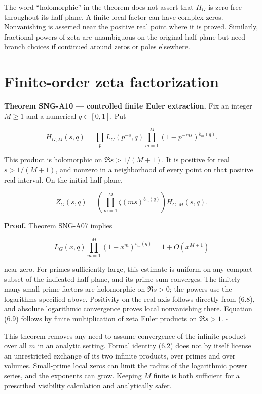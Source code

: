 \documentclass[
  11pt,
  a4paper,
]{report}
\begin{document}
The word ``holomorphic'' in the theorem does not assert that \(H_G\) is
zero-free throughout its half-plane. A finite local factor can have
complex zeros. Nonvanishing is asserted near the positive real point
where it is proved. Similarly, fractional powers of zeta are unambiguous
on the original half-plane but need branch choices if continued around
zeros or poles elsewhere.

\hypertarget{finite-order-zeta-factorization}{%
\section{Finite-order zeta
factorization}\label{finite-order-zeta-factorization}}

\textbf{Theorem SNG-A10 --- controlled finite Euler extraction.} Fix an
integer \(M\ge1\) and a numerical \(q\in[0,1]\). Put

\[
 H_{G,M}(s,q)=\prod_p L_G(p^{-s},q)
 \prod_{m=1}^{M}(1-p^{-ms})^{b_m(q)}.
 \tag{6.8}
\]

This product is holomorphic on \(\Re s>1/(M+1)\). It is positive for
real \(s>1/(M+1)\), and nonzero in a neighborhood of every point on that
positive real interval. On the initial half-plane,

\[
 Z_G(s,q)=
 \left(\prod_{m=1}^{M}\zeta(ms)^{b_m(q)}\right)H_{G,M}(s,q).
 \tag{6.9}
\]

\textbf{Proof.} Theorem SNG-A07 implies

\[
 L_G(x,q)\prod_{m=1}^M(1-x^m)^{b_m(q)}=1+O(x^{M+1})
\]

near zero. For primes sufficiently large, this estimate is uniform on
any compact subset of the indicated half-plane, and its prime sum
converges. The finitely many small-prime factors are holomorphic on
\(\Re s>0\); the powers use the logarithms specified above. Positivity
on the real axis follows directly from (6.8), and absolute logarithmic
convergence proves local nonvanishing there. Equation (6.9) follows by
finite multiplication of zeta Euler products on \(\Re s>1\). \(\square\)

This theorem removes any need to assume convergence of the infinite
product over all \(m\) in an analytic setting. Formal identity (6.2)
does not by itself license an unrestricted exchange of its two infinite
products, over primes and over volumes. Small-prime local zeros can
limit the radius of the logarithmic power series, and the exponents can
grow. Keeping \(M\) finite is both sufficient for a prescribed
visibility calculation and analytically safer.
\end{document}
